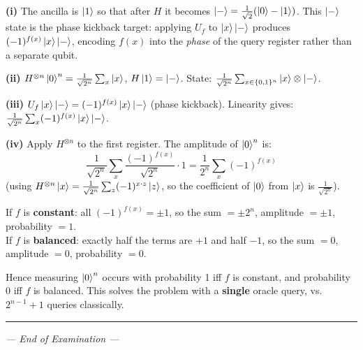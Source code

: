 \documentclass[12pt,a4paper]{exam}
\begin{document}
\begin{questions}
\begin{parts}
\begin{solution}
\textbf{(i)} The ancilla is $\ket{1}$ so that after $H$ it becomes $\ket{-}=\frac{1}{\sqrt2}(\ket0-\ket1)$. This $\ket{-}$ state is the phase kickback target: applying $U_f$ to $\ket{x}\ket{-}$ produces $(-1)^{f(x)}\ket{x}\ket{-}$, encoding $f(x)$ into the \emph{phase} of the query register rather than a separate qubit.

\textbf{(ii)} $H^{\otimes n}\ket{0}^n = \frac{1}{\sqrt{2^n}}\sum_x\ket{x}$, $H\ket{1}=\ket{-}$.
State: $\frac{1}{\sqrt{2^n}}\sum_{x\in\{0,1\}^n}\ket{x}\otimes\ket{-}$.

\textbf{(iii)} $U_f\ket{x}\ket{-} = (-1)^{f(x)}\ket{x}\ket{-}$ (phase kickback).
Linearity gives:
$\frac{1}{\sqrt{2^n}}\sum_x (-1)^{f(x)}\ket{x}\ket{-}$.

\textbf{(iv)} Apply $H^{\otimes n}$ to the first register. The amplitude of $\ket{0}^n$ is:
\[
\frac{1}{\sqrt{2^n}}\sum_{x}\frac{(-1)^{f(x)}}{\sqrt{2^n}} \cdot 1 = \frac{1}{2^n}\sum_x (-1)^{f(x)}
\]
(using $H^{\otimes n}\ket{x} = \frac{1}{\sqrt{2^n}}\sum_z (-1)^{x\cdot z}\ket{z}$, so the coefficient of $\ket{0}$ from $\ket{x}$ is $\frac{1}{\sqrt{2^n}}$).

If $f$ is \textbf{constant}: all $(-1)^{f(x)} = \pm 1$, so the sum $= \pm 2^n$, amplitude $= \pm 1$, probability $= 1$.\\
If $f$ is \textbf{balanced}: exactly half the terms are $+1$ and half $-1$, so the sum $= 0$, amplitude $= 0$, probability $= 0$.

Hence measuring $\ket{0}^n$ occurs with probability 1 iff $f$ is constant, and probability 0 iff $f$ is balanced.
This solves the problem with a \textbf{single} oracle query, vs.\ $2^{n-1}+1$ queries classically.
\end{solution}

\end{parts}

\end{questions}

\bigskip\hrule
\begin{center}
\textit{--- End of Examination ---}
\end{center}
\end{document}
